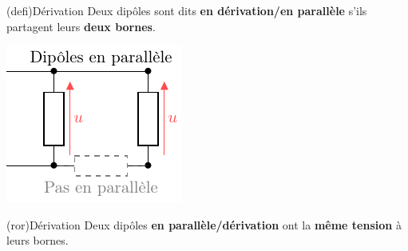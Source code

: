 \documentclass[../../main/main.tex]{subfiles}
\begin{document}
\begin{tcb}[sidebyside, righthand ratio=.4](defi){Dérivation}
	Deux dipôles sont dits \textbf{en dérivation/en parallèle} s'ils partagent
	leurs \textbf{deux bornes}.
	\tcblower
	\begin{center}
		\includegraphics[width=\linewidth]{derivation}
	\end{center}
\end{tcb}
\begin{tcb}[label=ror:serdiv, fontupper=\Large](ror){Dérivation}
	Deux dipôles \textbf{en parallèle/dérivation} ont la \textbf{même tension} à
	leurs bornes.
\end{tcb}
\end{document}

